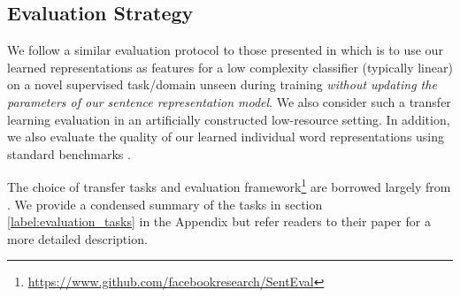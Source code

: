 \documentclass{article} \usepackage{iclr2018_conference,times}
\begin{document}
\subsection{Evaluation Strategy}

We follow a similar evaluation protocol to those presented in \cite{kiros2015skip, hill2016learning, conneau2017supervised} which is to use our learned representations as features for a low complexity classifier (typically linear) on a novel supervised task/domain unseen during training \emph{without updating the parameters of our sentence representation model}. We also consider such a transfer learning evaluation in an artificially constructed low-resource setting. In addition, we also evaluate the quality of our learned individual word representations using standard benchmarks \citep{faruqui2014community, tsvetkov2015evaluation}.

The choice of transfer tasks and evaluation framework\footnote{\url{https://www.github.com/facebookresearch/SentEval}} are borrowed largely from \cite{conneau2017supervised}. We provide a condensed summary of the tasks in section \ref{label:evaluation_tasks} in the Appendix but refer readers to their paper for a more detailed description.
\end{document}
